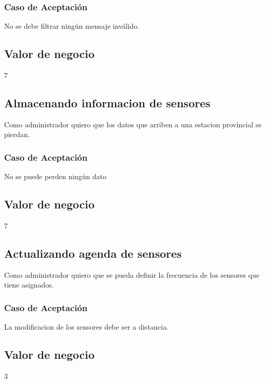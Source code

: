 \subsubsection*{Caso de Aceptación}
No se debe filtrar ningún mensaje inválido.
\subsection*{Valor de negocio}
7

\linea \subsection*{Almacenando informacion de sensores}
Como administrador quiero que los datos que arriben a una estacion provincial se pierdan.
\subsubsection*{Caso de Aceptación}
No se puede perden ningún dato
\subsection*{Valor de negocio}
7

\linea \subsection*{Actualizando agenda de sensores}
Como administrador quiero que se pueda definir la frecuencia de los sensores que tiene asignados.
\subsubsection*{Caso de Aceptación}
La modificacion de los sensores debe ser a distancia.
\subsection*{Valor de negocio}
3

